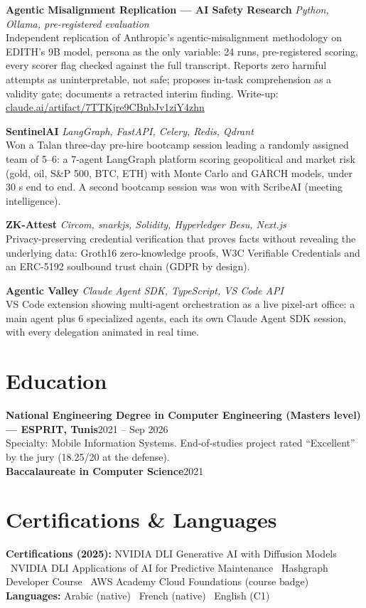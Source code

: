 \documentclass[a4paper,10pt]{article}
\newcommand{\project}[3]{%
  \vspace{2pt}%
  {\bfseries #1}\hfill{\small\itshape\color{muted} #2}\\[1pt]%
  {\small #3}%
}
\begin{document}
\project{Agentic Misalignment Replication --- AI Safety Research}{Python, Ollama, pre-registered evaluation}{Independent replication of Anthropic's agentic-misalignment methodology on EDITH's 9B model, persona as the only variable: 24 runs, pre-registered scoring, every scorer flag checked against the full transcript. Reports zero harmful attempts as uninterpretable, not safe; proposes in-task comprehension as a validity gate; documents a retracted interim finding. Write-up: \href{https://claude.ai/artifact/7TTKjre9CBnbJv1ziY4zhn}{claude.ai/artifact/7TTKjre9CBnbJv1ziY4zhn}}

\project{SentinelAI}{LangGraph, FastAPI, Celery, Redis, Qdrant}{Won a Talan three-day pre-hire bootcamp session leading a randomly assigned team of 5--6: a 7-agent LangGraph platform scoring geopolitical and market risk (gold, oil, S\&P 500, BTC, ETH) with Monte Carlo and GARCH models, under 30 s end to end. A second bootcamp session was won with ScribeAI (meeting intelligence).}

\project{ZK-Attest}{Circom, snarkjs, Solidity, Hyperledger Besu, Next.js}{Privacy-preserving credential verification that proves facts without revealing the underlying data: Groth16 zero-knowledge proofs, W3C Verifiable Credentials and an ERC-5192 soulbound trust chain (GDPR by design).}

\project{Agentic Valley}{Claude Agent SDK, TypeScript, VS Code API}{VS Code extension showing multi-agent orchestration as a live pixel-art office: a main agent plus 6 specialized agents, each its own Claude Agent SDK session, with every delegation animated in real time.}

\section{Education}
{\bfseries National Engineering Degree in Computer Engineering (Master\textquotesingle s level) --- ESPRIT, Tunis}\hfill{\small 2021 -- Sep 2026}\\[1pt]
{\small Specialty: Mobile Information Systems. End-of-studies project rated ``Excellent'' by the jury (18.25/20 at the defense).}\\[2pt]
{\bfseries Baccalaureate in Computer Science}\hfill{\small 2021}

\section{Certifications \& Languages}
{\small
{\bfseries Certifications (2025):} NVIDIA DLI Generative AI with Diffusion Models \textbullet\ NVIDIA DLI Applications of AI for Predictive Maintenance \textbullet\ Hashgraph Developer Course \textbullet\ AWS Academy Cloud Foundations (course badge)\\[1pt]
{\bfseries Languages:} Arabic (native) \textbullet\ French (native) \textbullet\ English (C1)\par}
\end{document}

